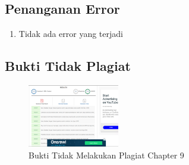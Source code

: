 \subsection{Penanganan Error}
\begin{enumerate}
	\item Tidak ada error yang terjadi
\end{enumerate}

\subsection{Bukti Tidak Plagiat}
\begin{figure}[H]
	\centering
		\includegraphics[width=4cm]{figures/1174040/chapter9/plagiaris.PNG}
		\caption{Bukti Tidak Melakukan Plagiat Chapter 9}
	\end{figure}

